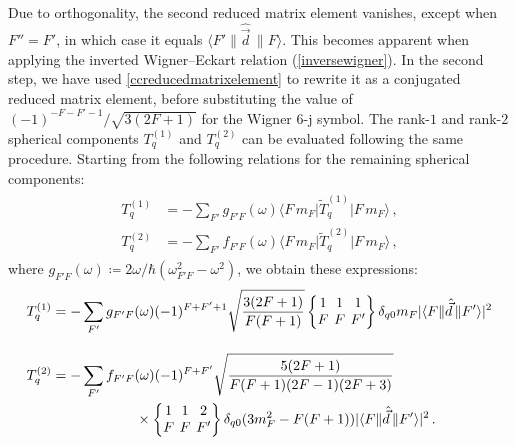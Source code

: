 \documentclass[../Thesis-IJspeert.tex]{subfiles}
\begin{document}
Due to orthogonality, the second reduced matrix element vanishes, except when $F''=F'$, in which case it equals $\langle{F'}\| \hat{\vec{d}} \, \|{F}\rangle$. This becomes apparent when applying the inverted Wigner--Eckart relation (\autoref{inversewigner}). In the second step, we have used \autoref{ccreducedmatrixelement} to rewrite it as a conjugated reduced matrix element, before substituting the value of $(-1)^{-F-F'-1}/\sqrt{3(2F+1)}$ for the Wigner 6-j symbol. The rank-$1$ and rank-$2$ spherical components $T^{(1)}_q$ and $T^{(2)}_q$ can be evaluated following the same procedure. Starting from the following relations for the remaining spherical components:
\begin{align}
\begin{split}
T^{(1)}_q&=-\sum_{F'} g_{F'F}(\omega) \langle F\, m_F \vert {\tilde{T}^{(1)}_q}  \vert F\, m_F \rangle\,,\\ T^{(2)}_q&=-\sum_{F'} f_{F'F}(\omega) \langle F\, m_F \vert {\tilde{T}^{(2)}_q}  \vert F\, m_F \rangle\,,
\end{split}
\end{align}
where $g_{F'F}(\omega)\coloneqq {2\omega }/{\hbar (\omega_{F' F}^2-\omega^2)}$, we obtain these expressions:
\begin{align}
\begin{split}
T^{(1)}_q&=-\sum_{F'} g_{F'F}(\omega) (-1)^{F+F'+1} \sqrt{\frac{3(2F+1)}{F(F+1)}} \tj{1}{1}{1}{F}{F}{F'} \delta_{q0} m_F  \lvert \langle{F}\| \hat{\vec{d}} \, \|{F'}\rangle\rvert^2\\[1em] T^{(2)}_q&=-\sum_{F'} f_{F'F}(\omega) (-1)^{F+F'} \sqrt{\frac{5(2F+1)}{F(F+1)(2F-1)(2F+3)}}\\ &\hspace{6em} \times \tj{1}{1}{2}{F}{F}{F'} \delta_{q0} (3m_F^2-F(F+1)) \lvert \langle{F}\| \hat{\vec{d}} \, \|{F'}\rangle\rvert^2\,.
\end{split}
\end{align}
\vspace{-1.75em}
\end{document}

